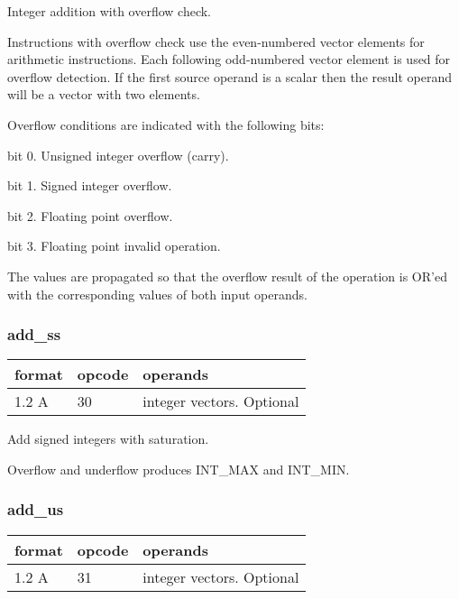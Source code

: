 \documentclass[forwardcom.tex]{subfiles}
\begin{document}
Integer addition with overflow check.
\vspace{2mm}

Instructions with overflow check use the even-numbered vector elements for arithmetic instructions. Each following odd-numbered vector element is used for overflow detection. If the first source operand is a scalar then the result operand will be a vector with two elements.
\vspace{2mm}

Overflow conditions are indicated with the following bits:
\vspace{2mm}

bit 0. Unsigned integer overflow (carry).

bit 1. Signed integer overflow.

bit 2. Floating point overflow.

bit 3. Floating point invalid operation.
\vspace{2mm}

The values are propagated so that the overflow result of the operation is OR'ed with the corresponding values of both input operands.
\vspace{2mm}

\subsubsection{add\_ss}
\label{table:addSsInstruction}
\begin{tabular}{|p{12mm}|p{12mm}|p{110mm}|}
\hline
\bfseries format & \bfseries opcode & \bfseries operands \\ \hline
1.2 A & 30 & integer vectors. Optional \\ \hline
\end{tabular}
\vspace{2mm}

Add signed integers with saturation.

Overflow and underflow produces INT\_MAX and INT\_MIN.

\subsubsection{add\_us}
\label{table:addUsInstruction}
\begin{tabular}{|p{12mm}|p{12mm}|p{110mm}|}
\hline
\bfseries format & \bfseries opcode & \bfseries operands \\ \hline
1.2 A & 31 & integer vectors. Optional \\ \hline
\end{tabular}
\vspace{2mm}
\end{document}
